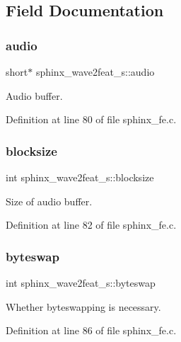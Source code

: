 \subsection{Field Documentation}
\mbox{\label{structsphinx__wave2feat__s_a776c72734abe1e34162a5ee347f533e5}} 
\subsubsection{audio}
{\footnotesize\ttfamily short$\ast$ sphinx\+\_\+wave2feat\+\_\+s\+::audio}



Audio buffer. 



Definition at line 80 of file sphinx\+\_\+fe.\+c.

\mbox{\label{structsphinx__wave2feat__s_aff2646e41780ceb9dcd234c719fd25f1}} 
\subsubsection{blocksize}
{\footnotesize\ttfamily int sphinx\+\_\+wave2feat\+\_\+s\+::blocksize}



Size of audio buffer. 



Definition at line 82 of file sphinx\+\_\+fe.\+c.

\mbox{\label{structsphinx__wave2feat__s_a030717e2736fd04d1a281f51e5db2799}} 
\subsubsection{byteswap}
{\footnotesize\ttfamily int sphinx\+\_\+wave2feat\+\_\+s\+::byteswap}



Whether byteswapping is necessary. 



Definition at line 86 of file sphinx\+\_\+fe.\+c.

\mbox{\label{structsphinx__wave2feat__s_a484d308befbde315664da8520ebc410d}} 

